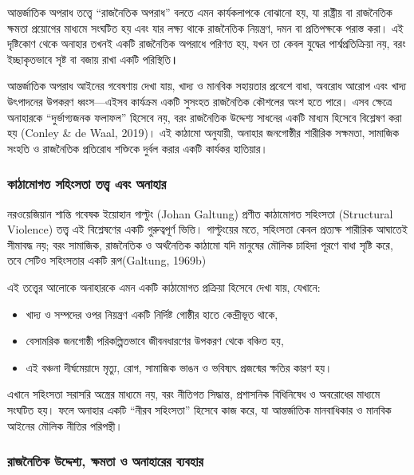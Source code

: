 আন্তর্জাতিক অপরাধ তত্ত্বে ``রাজনৈতিক অপরাধ'' বলতে এমন কার্যকলাপকে বোঝানো হয়,
যা রাষ্ট্রীয় বা রাজনৈতিক ক্ষমতা প্রয়োগের মাধ্যমে সংঘটিত হয় এবং যার লক্ষ্য থাকে
রাজনৈতিক নিয়ন্ত্রণ, দমন বা প্রতিপক্ষকে পরাস্ত করা। এই দৃষ্টিকোণ থেকে অনাহার
তখনই একটি রাজনৈতিক অপরাধে পরিণত হয়, যখন তা কেবল যুদ্ধের পার্শ্বপ্রতিক্রিয়া নয়,
বরং ইচ্ছাকৃতভাবে সৃষ্ট বা বজায় রাখা একটি পরিস্থিতি\textbf{।}

আন্তর্জাতিক অপরাধ আইনের গবেষণায় দেখা যায়, খাদ্য ও মানবিক সহায়তার প্রবেশে
বাধা, অবরোধ আরোপ এবং খাদ্য উৎপাদনের উপকরণ ধ্বংস---এইসব কার্যক্রম একটি সুসংহত
রাজনৈতিক কৌশলের অংশ হতে পারে। এসব ক্ষেত্রে অনাহারকে ``দুর্ভাগ্যজনক ফলাফল''
হিসেবে নয়, বরং রাজনৈতিক উদ্দেশ্য সাধনের একটি মাধ্যম হিসেবে বিশ্লেষণ করা হয়
(Conley \& de Waal, 2019)। এই কাঠামো অনুযায়ী, অনাহার জনগোষ্ঠীর শারীরিক
সক্ষমতা, সামাজিক সংহতি ও রাজনৈতিক প্রতিরোধ শক্তিকে দুর্বল করার একটি কার্যকর
হাতিয়ার।

\subsubsection{কাঠামোগত সহিংসতা তত্ত্ব এবং
অনাহার}\label{ux995ux9a0ux9aeux997ux9a4-ux9b8ux9b9ux9b8ux9a4-ux9a4ux9a4ux9a4ux9ac-ux98fux9ac-ux985ux9a8ux9b9ux9b0}

নরওয়েজিয়ান শান্তি গবেষক ইয়োহান গাল্টুং (Johan Galtung) প্রণীত কাঠামোগত
সহিংসতা (Structural Violence) তত্ত্ব এই বিশ্লেষণের একটি গুরুত্বপূর্ণ ভিত্তি।
গাল্টুংয়ের মতে, সহিংসতা কেবল প্রত্যক্ষ শারীরিক আঘাতেই সীমাবদ্ধ নয়; বরং
সামাজিক, রাজনৈতিক ও অর্থনৈতিক কাঠামো যদি মানুষের মৌলিক চাহিদা পূরণে বাধা
সৃষ্টি করে, তবে সেটিও সহিংসতার একটি রূপ(Galtung, 1969b)

এই তত্ত্বের আলোকে অনাহারকে এমন একটি কাঠামোগত প্রক্রিয়া হিসেবে দেখা যায়,
যেখানে:

\begin{itemize}
\item
  খাদ্য ও সম্পদের ওপর নিয়ন্ত্রণ একটি নির্দিষ্ট গোষ্ঠীর হাতে কেন্দ্রীভূত থাকে,
\item
  বেসামরিক জনগোষ্ঠী পরিকল্পিতভাবে জীবনধারণের উপকরণ থেকে বঞ্চিত হয়,
\item
  এই বঞ্চনা দীর্ঘমেয়াদে মৃত্যু, রোগ, সামাজিক ভাঙন ও ভবিষ্যৎ প্রজন্মের ক্ষতির কারণ
  হয়।
\end{itemize}

এখানে সহিংসতা সরাসরি অস্ত্রের মাধ্যমে নয়, বরং নীতিগত সিদ্ধান্ত, প্রশাসনিক
বিধিনিষেধ ও অবরোধের মাধ্যমে সংঘটিত হয়। ফলে অনাহার একটি ``নীরব সহিংসতা''
হিসেবে কাজ করে, যা আন্তর্জাতিক মানবাধিকার ও মানবিক আইনের মৌলিক নীতির
পরিপন্থী।

\subsubsection{রাজনৈতিক উদ্দেশ্য, ক্ষমতা ও অনাহারের
ব্যবহার}\label{ux9b0ux99cux9a8ux9a4ux995-ux989ux9a6ux9a6ux9b6ux9af-ux995ux9b7ux9aeux9a4-ux993-ux985ux9a8ux9b9ux9b0ux9b0-ux9acux9afux9acux9b9ux9b0}

